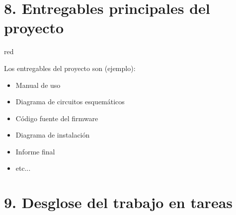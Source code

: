 \documentclass[
11pt, %
]{charter}
\begin{document}
\section{8. Entregables principales del proyecto}
\label{sec:entregables}

\begin{consigna}{red}

Los entregables del proyecto son (ejemplo):

\begin{itemize}
	\item Manual de uso
	\item Diagrama de circuitos esquemáticos
	\item Código fuente del firmware
	\item Diagrama de instalación
	\item Informe final
	\item etc...
\end{itemize}

\end{consigna}

\section{9. Desglose del trabajo en tareas}
\label{sec:wbs}
\end{document}
